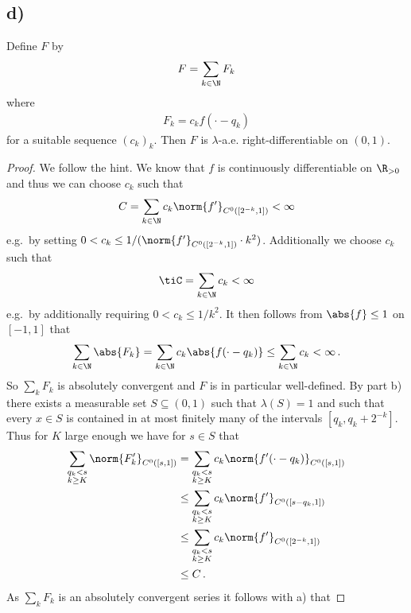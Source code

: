 \subsection{d)}
\begin{claim}
Define $F$ by
\begin{align}
	F=\sum_{k\in\N}F_k\label{def:F}
\end{align}
where
\begin{align*}
	F_k= c_kf(\cdot-q_k)
\end{align*}
for a suitable sequence $(c_k)_k$. Then $F$ is $\lambda$-a.e. right-differentiable on $(0,1)$. 
\end{claim}
\begin{proof}
We follow the hint.
We know that $f$ is continuously differentiable on $\R_{>0}$ and thus we can choose $c_k$ such that
\begin{align*}
	C=\sum_{k\in\N}c_k\norm{f'}_{C^0([2^{-k},1])}<\infty
\end{align*}
e.g.\ by setting $0<c_k\leq 1/(\norm{f'}_{C^0([2^{-k},1])}\cdot k^2)$. Additionally we choose $c_k$ such that
\begin{align*}
	\tiC=\sum_{k\in\N}c_k<\infty
\end{align*}
e.g.\ by additionally requiring $0<c_k\leq 1/k^2$.
It then follows from $\abs{f}\leq 1$ on $[-1,1]$ that
\begin{align*}
	\sum_{k\in\N}\abs{F_k}
	= \sum_{k\in\N}c_k\abs{f(\cdot-q_k)}
	\leq \sum_{k\in\N}c_k<\infty\,.
\end{align*}
So $\sum_kF_k$ is absolutely convergent and $F$ is in particular well-defined. By part b) there exists a measurable set $S\subseteq(0,1)$ such that $\lambda(S)=1$ and such that every $x\in S$ is contained in at most finitely many of the intervals $[q_k,q_k+2^{-k}]$. Thus for $K$ large enough we have for $s\in S$ that
\begin{align*}
	\sum_{\substack{q_k< s\\k\geq K}}\norm{F'_k}_{C^0([s,1])}
	&= \sum_{\substack{q_k< s\\k\geq K}}c_k\norm{f'(\cdot-q_k)}_{C^0([s,1])} \\
	&\leq \sum_{\substack{q_k< s\\k\geq K}}c_k\norm{f'}_{C^0([s-q_k,1])} \\
	&\leq \sum_{\substack{q_k< s\\k\geq K}}c_k\norm{f'}_{C^0([2^{-k},1])} \\
	&\leq C\,.
\end{align*}
As $\sum_kF_k$ is an absolutely convergent series it follows with a) that

\end{proof}
